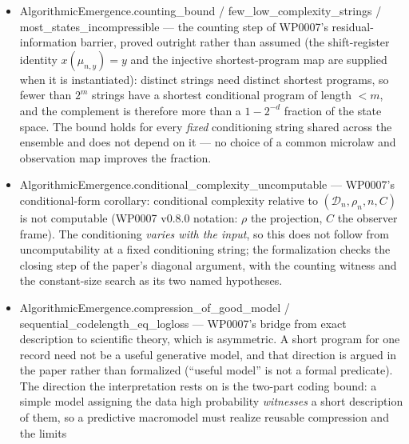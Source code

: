 \documentclass[11pt,a4paper]{article}
\newcommand{\lean}[1]{{\ttfamily\small
  \let\leanunderscore\_\def\_{\leanunderscore\allowbreak}#1}}
\begin{document}
\begin{itemize}[leftmargin=1.4em,itemsep=1pt]
\lean{BoundOutrun} (the competitor is describable from the search index, so its length is
$O(\log k)$), and \lean{WitnessCompresses} (the padded program beats the literal length by the
declared slack). This declaration is the arithmetic core: it does not say that the two programs
print the record, and it requires compression at every index. The statement matching WP0007's
corollary is \lean{relational\_optimality\_barrier\_valid}, which carries the output predicate
$U(p)=x$ for both programs into the conclusion and needs compression only from some index on
(\lean{WitnessCompressesEventually}), as the paper's estimate gives.
\item \lean{AlgorithmicEmergence.counting\_bound} / \lean{few\_low\_complexity\_strings} /
\lean{most\_states\_incompressible} --- the counting step of WP0007's residual-information
barrier, proved outright rather than assumed (the shift-register identity $x(\mu_{n,y})=y$ and the
injective shortest-program map are supplied when it is instantiated): distinct strings need distinct shortest programs, so fewer than $2^{m}$
strings have a shortest conditional program of length $<m$, and the complement is therefore more
than a $1-2^{-d}$ fraction of the state space. The bound holds for every \emph{fixed} conditioning
string shared across the ensemble and does not depend on it --- no choice of a common microlaw and
observation map improves the fraction.
\item \lean{AlgorithmicEmergence.conditional\_complexity\_uncomputable} --- WP0007's conditional-form corollary:
conditional complexity relative to $(\mathcal D_n,\rho_n,n,C)$ is not computable (WP0007 v0.8.0 notation: $\rho$ the projection, $C$ the observer frame). The conditioning
\emph{varies with the input}, so this does not follow from uncomputability at a fixed conditioning
string; the formalization checks the closing step of the paper's diagonal argument, with the
counting witness and the constant-size search as its two named hypotheses.
\item \lean{AlgorithmicEmergence.compression\_of\_good\_model} /
\lean{sequential\_codelength\_eq\_logloss} --- WP0007's bridge from exact description to
scientific theory, which is asymmetric. A short program for one record need not be a useful
generative model, and that direction is argued in the paper rather than formalized (``useful
model'' is not a formal predicate). The direction the interpretation rests on is the two-part
coding bound: a simple model assigning the data high probability \emph{witnesses} a short
description of them, so a predictive macromodel must realize reusable compression and the limits

\end{itemize}
\end{document}
